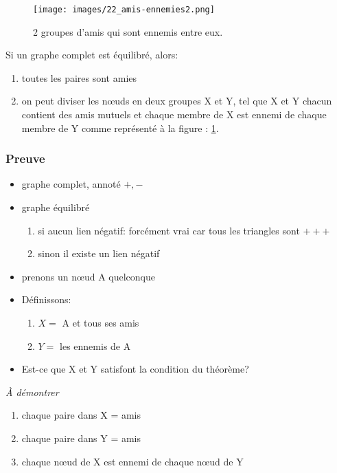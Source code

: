 \begin{figure}[!ht]
	\centering
	\texttt{[image: images/22\_amis-ennemies2.png]}
	\caption{2 groupes d'amis qui sont ennemis entre eux.}
    \label{groupami}
\end{figure}

Si un graphe complet est équilibré, alors:

\begin{enumerate}
	\item toutes les paires sont amies
	\item on peut diviser les nœuds en deux groupes X et Y, tel que X et Y chacun contient des amis mutuels et chaque membre de X est ennemi de chaque membre de Y comme représenté à la figure : \ref{groupami}.
\end{enumerate}

\subsubsection*{Preuve}

\begin{itemize}\renewcommand\labelitemi{\textbullet}
	\item graphe complet, annoté $+,-$
	\item graphe équilibré
	
	\begin{enumerate}
		\item si aucun lien négatif: forcément vrai car tous les triangles sont $+++$
		\item sinon il existe un lien négatif
	\end{enumerate}

	\item prenons un nœud A quelconque
	\item Définissons:

	\begin{enumerate}
		\item $X = $ A et tous ses amis
		\item $Y = $ les ennemis de A
	\end{enumerate}

	\item Est-ce que X et Y satisfont la condition du théorème?
\end{itemize}

\textit{À démontrer}

\begin{enumerate}
	\item chaque paire dans X = amis
	\item chaque paire dans Y = amis
	\item chaque nœud de X est ennemi de chaque nœud de Y
\end{enumerate}

